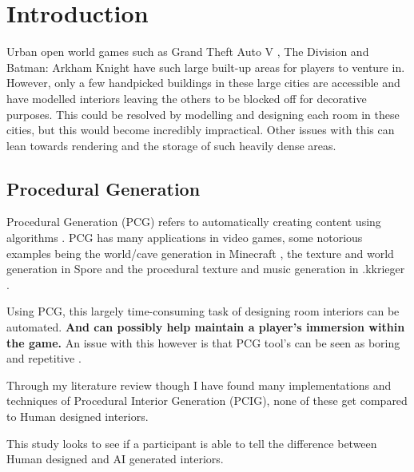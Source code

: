\section{Introduction}

Urban open world games such as Grand Theft Auto V \cite{game:gta}, The Division \cite{game:division} 
and Batman: Arkham Knight \cite{game:arkham-knight}
have such large built-up areas for players to venture in.
However, only a few handpicked buildings in these large cities are accessible and have 
modelled interiors leaving the others to be blocked off for decorative purposes.
This could be resolved by modelling and designing each room in these cities, 
but this would become incredibly impractical. 
Other issues with this can lean towards rendering and the storage of such heavily dense areas.

\subsection*{Procedural Generation}
Procedural Generation (PCG) refers to automatically creating content using algorithms \cite{what-is-pcg}.
PCG has many applications in video games,
some notorious examples being the world/cave generation in Minecraft \cite{game:minecraft},
the texture\cite{game:spore-texture} and world generation\cite{game:spore-world} in Spore \cite{game:spore}
and the procedural texture and music generation in .kkrieger \cite{game:kkreiger}.

Using PCG, this largely time-consuming task of designing room interiors can be automated. 
\textbf{And can possibly help maintain a player's immersion within the game. }
An issue with this however is that PCG tool's can be seen as boring and repetitive \cite{pcg_in_gd}.

Through my literature review though I have found many implementations and techniques of Procedural Interior 
Generation (PCIG), none of these get compared to Human designed interiors. 
\bigskip

This study looks to see if a participant is able to tell the difference between Human designed and AI 
generated interiors.

